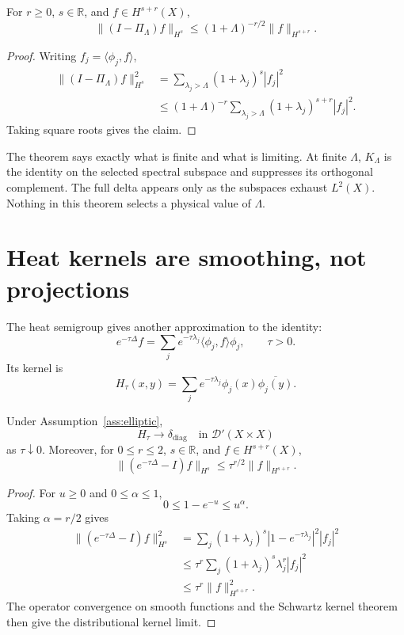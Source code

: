 \documentclass[11pt]{article}
\newcommand{\Dcal}{\mathcal D}
\begin{document}
\begin{theorem}
\label{thm:spectral-error}
For \(r\geq0\), \(s\in\mathbb R\), and
\(f\in H^{s+r}(X)\),
\[
\|(I-\Pi_\Lambda)f\|_{H^s}
\leq
(1+\Lambda)^{-r/2}\|f\|_{H^{s+r}}.
\]
\end{theorem}

\begin{proof}
Writing \(f_j=\langle\phi_j,f\rangle\),
\begin{align*}
\|(I-\Pi_\Lambda)f\|_{H^s}^2
&=
\sum_{\lambda_j>\Lambda}
(1+\lambda_j)^s|f_j|^2\\
&\leq
(1+\Lambda)^{-r}
\sum_{\lambda_j>\Lambda}
(1+\lambda_j)^{s+r}|f_j|^2.
\end{align*}
Taking square roots gives the claim.
\end{proof}

The theorem says exactly what is finite and what is limiting. At finite
\(\Lambda\), \(K_\Lambda\) is the identity on the selected spectral subspace
and suppresses its orthogonal complement. The full delta appears only as the
subspaces exhaust \(L^2(X)\). Nothing in this theorem selects a physical value
of \(\Lambda\).

\section{Heat kernels are smoothing, not projections}

The heat semigroup gives another approximation to the identity:
\[
e^{-\tau\Delta}f
=\sum_j e^{-\tau\lambda_j}
\langle\phi_j,f\rangle\phi_j,
\qquad \tau>0.
\]
Its kernel is
\[
H_\tau(x,y)
=\sum_j e^{-\tau\lambda_j}
\phi_j(x)\overline{\phi_j(y)}.
\]

\begin{theorem}
\label{thm:heat}
Under Assumption~\ref{ass:elliptic},
\[
H_\tau\longrightarrow\delta_{\mathrm{diag}}
\quad\text{in }\Dcal'(X\times X)
\]
as \(\tau\downarrow0\). Moreover, for \(0\leq r\leq2\),
\(s\in\mathbb R\), and \(f\in H^{s+r}(X)\),
\[
\|(e^{-\tau\Delta}-I)f\|_{H^s}
\leq
\tau^{r/2}\|f\|_{H^{s+r}}.
\]
\end{theorem}

\begin{proof}
For \(u\geq0\) and \(0\leq\alpha\leq1\),
\[
0\leq1-e^{-u}\leq u^\alpha.
\]
Taking \(\alpha=r/2\) gives
\begin{align*}
\|(e^{-\tau\Delta}-I)f\|_{H^s}^2
&=
\sum_j(1+\lambda_j)^s
|1-e^{-\tau\lambda_j}|^2|f_j|^2\\
&\leq
\tau^r
\sum_j(1+\lambda_j)^s\lambda_j^r|f_j|^2\\
&\leq
\tau^r\|f\|_{H^{s+r}}^2.
\end{align*}
The operator convergence on smooth functions and the Schwartz kernel theorem
then give the distributional kernel limit.
\end{proof}
\end{document}
